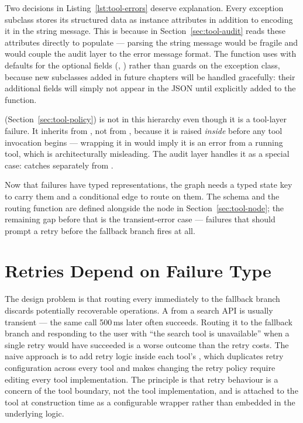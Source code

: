 Two decisions in Listing~\ref{lst:tool-errors} deserve explanation.
Every exception subclass stores its structured data as instance attributes
in addition to encoding it in the string message. This is because
 in Section~\ref{sec:tool-audit} reads these
attributes directly to populate  ---
parsing the string message would be fragile and would couple the audit
layer to the error message format. The 
function uses  with defaults for the optional fields
(, ) rather than 
guards on the exception class, because new  subclasses
added in future chapters will be handled gracefully: their additional fields
will simply not appear in the JSON until explicitly added to the function.

\begin{notebox}
 (Section~\ref{sec:tool-policy}) is not in
this hierarchy even though it is a tool-layer failure. It inherits from
, not from , because it is raised
\emph{inside}  before any tool invocation
begins --- wrapping it in  would imply it is an error
from a running tool, which is architecturally misleading. The audit layer
handles it as a special case:  catches
 separately from .
\end{notebox}

Now that failures have typed representations, the graph needs a typed state
key to carry them and a conditional edge to route on them. The
 schema and the routing function are defined alongside
the node in Section~\ref{sec:tool-node}; the remaining gap before that is
the transient-error case --- failures that should prompt a retry before the
fallback branch fires at all.


\section{Retries Depend on Failure Type}
\label{sec:tool-retry}

The design problem is that routing every 
immediately to the fallback branch discards potentially recoverable
operations. A  from a search API is usually
transient --- the same call 500\,ms later often succeeds. Routing it to the
fallback branch and responding to the user with ``the search tool is
unavailable'' when a single retry would have succeeded is a worse outcome
than the retry costs. The naive approach is to add retry logic inside each
tool's , which duplicates retry configuration across every tool
and makes changing the retry policy require editing every tool
implementation. The principle is that retry behaviour is a concern of the
tool boundary, not the tool implementation, and is attached to the tool at
construction time as a configurable wrapper rather than embedded in the
underlying logic.


